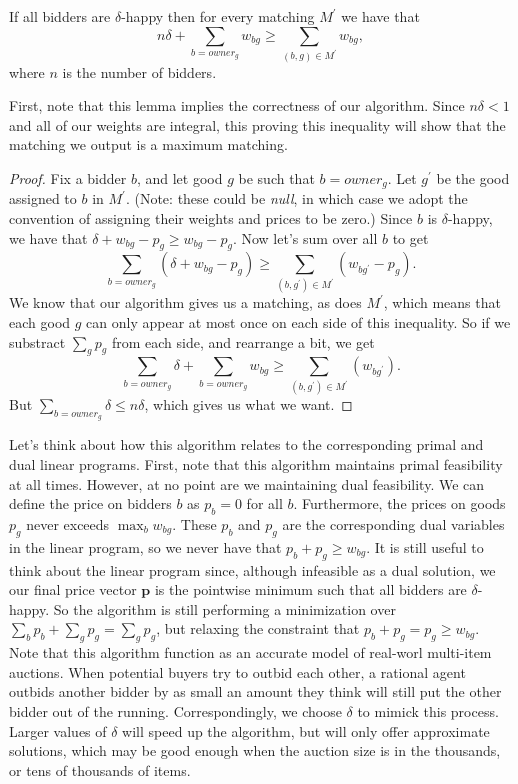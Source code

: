 \documentclass[11pt]{article}
\renewcommand{\'}{^{'}}
\newenvironment{lemma}[2][Lemma]{\begin{trivlist}
\item[\hskip \labelsep {\bfseries #1}\hskip \labelsep {\bfseries #2.}]}{\end{trivlist}}
\begin{document}
\begin{lemma}{}
	If all bidders are $\delta$-happy then for every matching $M\'$ we have that 
	\[
		n\delta + \sum_{b = owner_g} w_{bg} \geq \sum_{(b,g)\in M\'} w_{bg},
	\]
	where $n$ is the number of bidders. 
\end{lemma}

First, note that this lemma implies the correctness of our algorithm. Since $n\delta < 1$ and all of 
our weights are integral, this proving this inequality will show that the matching we output is 
a maximum matching.

\begin{proof}
	Fix a bidder $b$, and let good $g$ be such that $b = owner_g$. Let $g\'$ be the good assigned 
	to $b$ in $M\'$. (Note: these could be \emph{null}, in which case we adopt the convention of 
	assigning their weights and prices to be zero.) Since $b$ is $\delta$-happy, we have that 
	$\delta + w_{bg} - p_g \geq w_{bg} - p_g$. Now let's sum over all $b$ to get 
	\[
		\sum_{b=owner_g} (\delta + w_{bg} - p_g) \geq \sum_{(b,g\')\in M\'} (w_{bg\'} - p_g).
	\]
	We know that our algorithm gives us a matching, as does $M\'$, which means that each good $g$ 
	can only appear at most once on each side of this inequality. So if we substract $\sum_g p_g$ 
	from each side, and rearrange a bit, we get 
	\[
		\sum_{b=owner_g} \delta + \sum_{b=owner_g} w_{bg} \geq \sum_{(b,g\')\in M\'} (w_{bg\'}). 
	\]
	But $\sum_{b=owner_g} \delta \leq n\delta$, which gives us what we want.
\end{proof}

Let's think about how this algorithm relates to the corresponding primal and dual linear programs. 
First, note that this algorithm maintains primal feasibility at all times. However, at no point are we 
maintaining dual feasibility. We can define the price on bidders $b$ as $p_b = 0$ for all $b$. 
Furthermore, the prices on goods $p_g$ never exceeds $\max_{b} w_{bg}$. These $p_b$ and $p_g$ are 
the corresponding dual variables in the linear program, so we never have that $p_b + p_g \geq w_{bg}$. 
It is still useful to think about the linear program since, although infeasible as a dual solution, 
we our final price vector $\mathbf{p}$ is the pointwise minimum such that all bidders are $\delta$-
happy. So the algorithm is still performing a minimization over $\sum_b p_b + \sum_g p_g = \sum_g p_g$, 
but relaxing the constraint that $p_b + p_g = p_g \geq w_{bg}$.\\
Note that this algorithm function as an accurate model of real-worl multi-item auctions. When potential 
buyers try to outbid each other, a rational agent outbids another bidder by as small an amount they 
think will still put the other bidder out of the running. Correspondingly, we choose $\delta$ to mimick 
this process. Larger values of $\delta$ will speed up the algorithm, but will only offer approximate 
solutions, which may be good enough when the auction size is in the thousands, or tens of thousands of 
items.
\end{document}
